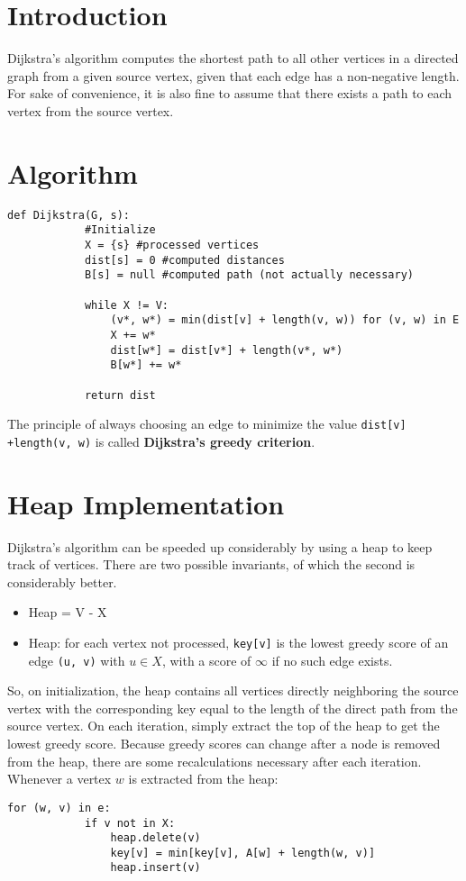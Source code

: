 \documentclass[11pt]{article}
\begin{document}
\section{Introduction}
	Dijkstra's algorithm computes the shortest path to all other vertices in a directed graph from a given source vertex, given that each edge has a non-negative length. For sake of convenience, it is also fine to assume that there exists a path to each vertex from the source vertex.
	
\section{Algorithm}
	\begin{lstlisting}[autogobble=true]
		def Dijkstra(G, s):
			#Initialize
			X = {s}	#processed vertices
			dist[s] = 0	#computed distances
			B[s] = null	#computed path (not actually necessary)

			while X != V:
				(v*, w*) = min(dist[v] + length(v, w)) for (v, w) in E
				X += w*
				dist[w*] = dist[v*] + length(v*, w*)
				B[w*] += w*

			return dist
	\end{lstlisting}

	The principle of always choosing an edge to minimize the value \verb|dist[v]| \verb|+length(v, w)| is called \textbf{Dijkstra's greedy criterion}. 

\section{Heap Implementation}
	Dijkstra's algorithm can be speeded up considerably by using a heap to keep track of vertices. There are two possible invariants, of which the second is considerably better.
	\begin{itemize}
		\item Heap = V - X
		\item Heap: for each vertex not processed, \verb|key[v]| is the lowest greedy score of an edge \verb|(u, v)| with $u\in X$, with a score of $\infty$ if no such edge exists.
	\end{itemize}
	
	So, on initialization, the heap contains all vertices directly neighboring the source vertex with the corresponding key equal to the length of the direct path from the source vertex. On each iteration, simply extract the top of the heap to get the lowest greedy score. Because greedy scores can change after a node is removed from the heap, there are some recalculations necessary after each iteration. Whenever a vertex $w$ is extracted from the heap:
	\begin{lstlisting}[autogobble]
		for (w, v) in e:
			if v not in X:
				heap.delete(v)
				key[v] = min[key[v], A[w] + length(w, v)]
				heap.insert(v)
	\end{lstlisting}
\end{document}
